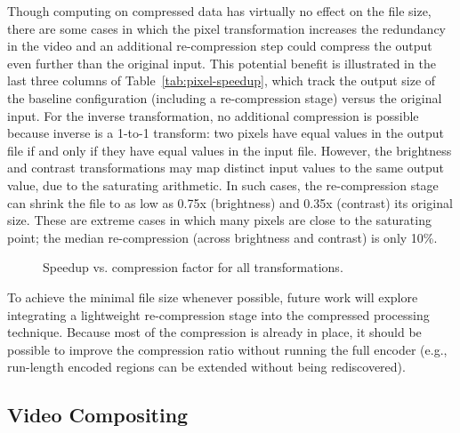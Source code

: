 Though computing on compressed data has virtually no effect on the
file size, there are some cases in which the pixel transformation
increases the redundancy in the video and an additional re-compression
step could compress the output even further than the original input.
This potential benefit is illustrated in the last three columns of
Table~\ref{tab:pixel-speedup}, which track the output size of the
baseline configuration (including a re-compression stage) versus the
original input.  For the inverse transformation, no additional
compression is possible because inverse is a 1-to-1 transform: two
pixels have equal values in the output file if and only if they have
equal values in the input file.  However, the brightness and contrast
transformations may map distinct input values to the same output
value, due to the saturating arithmetic.  In such cases, the
re-compression stage can shrink the file to as low as 0.75x
(brightness) and 0.35x (contrast) its original size.  These are
extreme cases in which many pixels are close to the saturating point;
the median re-compression (across brightness and contrast) is only
10\%.

\begin{figure}[t!]
\centering
{}
\caption{Speedup vs. compression factor for all transformations.
\protect\label{fig:speedup-scatter}}
\end{figure}

To achieve the minimal file size whenever possible, future work will
explore integrating a lightweight re-compression stage into the
compressed processing technique.  Because most of the compression is
already in place, it should be possible to improve the compression
ratio without running the full encoder (e.g., run-length encoded
regions can be extended without being rediscovered).  

%

\subsection*{Video Compositing}

